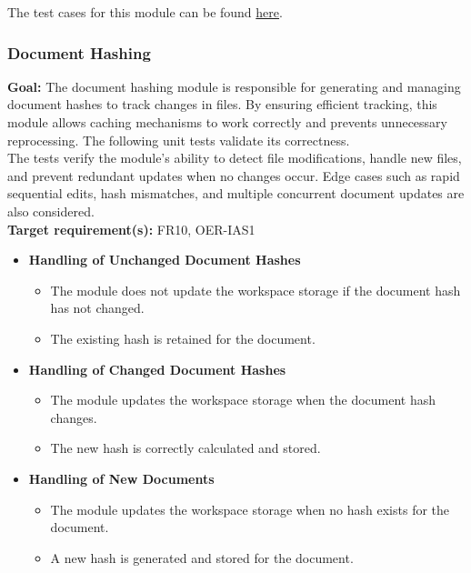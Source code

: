 \documentclass[12pt, titlepage]{article}
\begin{document}
  \noindent The test cases for this module can be found
  \href{https://github.com/ssm-lab/capstone--sco-vs-code-plugin/blob/plugin-multi-file/test/commands/refactorSmell.test.ts}{here}.

  \subsubsection{Document Hashing}

  \textbf{Goal:} The document hashing module is responsible for
  generating and managing document hashes to track changes in files.
  By ensuring efficient tracking, this module allows caching
  mechanisms to work correctly and prevents unnecessary reprocessing.
  The following unit tests validate its correctness.\\

  \noindent The tests verify the module’s ability to detect file
  modifications, handle new files, and prevent redundant updates when
  no changes occur. Edge cases such as rapid sequential edits, hash
  mismatches, and multiple concurrent document updates are also considered.\\

  \noindent\textbf{Target requirement(s):} FR10, OER-IAS1~\cite{SRS} \\

  \begin{itemize}
    \item \textbf{Handling of Unchanged Document Hashes}
      \begin{itemize}
        \item The module does not update the workspace storage if the
          document hash has not changed.
        \item The existing hash is retained for the document.
      \end{itemize}

    \item \textbf{Handling of Changed Document Hashes}
      \begin{itemize}
        \item The module updates the workspace storage when the
          document hash changes.
        \item The new hash is correctly calculated and stored.
      \end{itemize}

    \item \textbf{Handling of New Documents}
      \begin{itemize}
        \item The module updates the workspace storage when no hash
          exists for the document.
        \item A new hash is generated and stored for the document.
      \end{itemize}
  \end{itemize}
\end{document}
